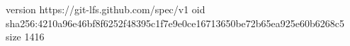 version https://git-lfs.github.com/spec/v1
oid sha256:4210a96e46bf8f6252f48395c1f7e9e0ce16713650be72b65ea925e60b6268c5
size 1416
